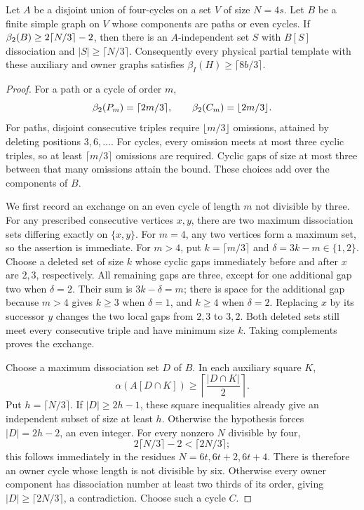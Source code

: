 \begin{theorem}\label{thm:auxiliary-square-parity}
Let $A$ be a disjoint union of four-cycles on a set $V$ of size $N=4s$.
Let $B$ be a finite simple graph on $V$ whose components are paths or even
cycles. If $\beta_2(B)\ge2\lceil N/3\rceil-2$, then there is an $A$-independent
set $S$ with $B[S]$ dissociation and $|S|\ge\lceil N/3\rceil$.
Consequently every physical partial template with these auxiliary and owner
graphs satisfies $\beta_I(H)\ge\lceil8b/3\rceil$.
\end{theorem}
\begin{proof}
For a path or a cycle of order $m$,
\[
 \beta_2(P_m)=\lceil2m/3\rceil,\qquad
 \beta_2(C_m)=\lfloor2m/3\rfloor.
\]
For paths, disjoint consecutive triples require $\lfloor m/3\rfloor$
omissions, attained by deleting positions $3,6,\ldots$.
For cycles, every omission meets at most three cyclic triples, so at least
$\lceil m/3\rceil$ omissions are required. Cyclic gaps of size at most three
between that many omissions attain the bound. These choices add over the
components of $B$.

We first record an exchange on an even cycle of length $m$ not divisible by
three. For any prescribed consecutive vertices $x,y$, there are two maximum
dissociation sets differing exactly on $\{x,y\}$.
For $m=4$, any two vertices form a maximum set, so the assertion is immediate.
For $m>4$, put $k=\lceil m/3\rceil$ and $\delta=3k-m\in\{1,2\}$.
Choose a deleted set of size $k$ whose cyclic gaps immediately before and
after $x$ are $2,3$, respectively. All remaining gaps are three, except for
one additional gap two when $\delta=2$.
Their sum is $3k-\delta=m$; there is space for the additional gap because
$m>4$ gives $k\ge3$ when $\delta=1$, and $k\ge4$ when $\delta=2$.
Replacing $x$ by its successor $y$ changes the two local gaps from $2,3$ to
$3,2$. Both deleted sets still meet every consecutive triple and have minimum
size $k$. Taking complements proves the exchange.

Choose a maximum dissociation set $D$ of $B$. In each auxiliary square $K$,
\[
 \alpha(A[D\cap K])\ge\left\lceil\frac{|D\cap K|}{2}\right\rceil.
\]
Put $h=\lceil N/3\rceil$. If $|D|\ge2h-1$, these square inequalities
already give an independent subset of size at least $h$.
Otherwise the hypothesis forces $|D|=2h-2$, an even integer.
For every nonzero $N$ divisible by four,
\[
 2\lceil N/3\rceil-2<\lceil2N/3\rceil;
\]
this follows immediately in the residues $N=6t,6t+2,6t+4$.
There is therefore an owner cycle whose length is not divisible by six.
Otherwise every owner component has dissociation number at least two thirds
of its order, giving $|D|\ge\lceil2N/3\rceil$, a contradiction.
Choose such a cycle $C$.


\end{proof}
